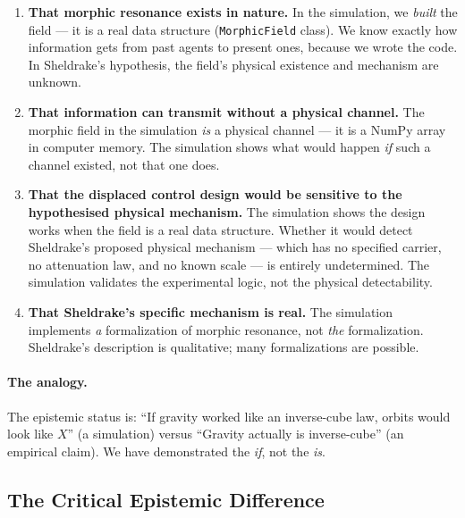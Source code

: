 \documentclass[twoside,11pt]{article}
\begin{document}
\begin{enumerate}[leftmargin=2em]
    \item \textbf{That morphic resonance exists in nature.}  In the
          simulation, we \emph{built} the field --- it is a real data
          structure (\texttt{MorphicField} class).  We know exactly how
          information gets from past agents to present ones, because we wrote
          the code.  In Sheldrake's hypothesis, the field's physical
          existence and mechanism are unknown.

    \item \textbf{That information can transmit without a physical channel.}
          The morphic field in the simulation \emph{is} a physical channel
          --- it is a NumPy array in computer memory.  The simulation shows
          what would happen \emph{if} such a channel existed, not that one
          does.

    \item \textbf{That the displaced control design would be sensitive to the
          hypothesised physical mechanism.}  The simulation shows the design
          works when the field is a real data structure.  Whether it would
          detect Sheldrake's proposed physical mechanism --- which has no
          specified carrier, no attenuation law, and no known scale --- is
          entirely undetermined.  The simulation validates the experimental
          logic, not the physical detectability.

    \item \textbf{That Sheldrake's specific mechanism is real.}  The
          simulation implements \emph{a} formalization of morphic resonance,
          not \emph{the} formalization.  Sheldrake's description is
          qualitative; many formalizations are possible.
\end{enumerate}

\paragraph{The analogy.}
The epistemic status is: ``If gravity worked like an inverse-cube law, orbits
would look like $X$'' (a simulation) versus ``Gravity actually is
inverse-cube'' (an empirical claim).  We have demonstrated the \emph{if}, not
the \emph{is}.

\subsection{The Critical Epistemic Difference}
\label{sec:epistemology:difference}
\end{document}
